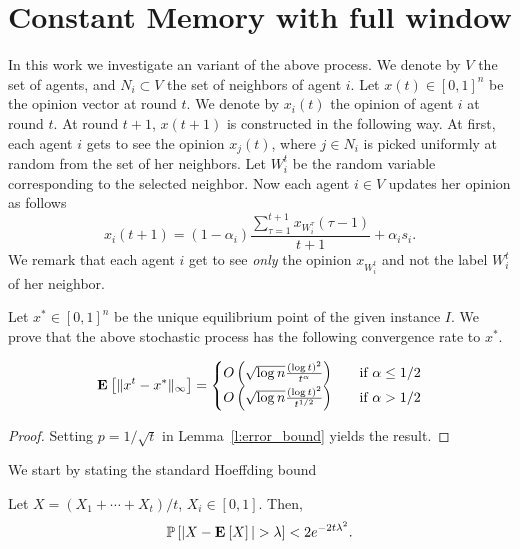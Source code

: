 \section{Constant Memory with full window}

In this work we investigate an variant of the above process.
We denote by $V$ the set of agents, and $N_{i} \subset V$ the set of neighbors
of agent $i$.
Let $x(t) \in [0,1]^n$ be the opinion vector at round $t$.
We denote by $x_i(t)$ the opinion of agent $i$ at round $t$.
At round $t+1$, $x(t+1)$ is constructed in the following way.
At first, each agent $i$ gets to see
the opinion $x_j(t)$, where $j \in N_i$ is picked uniformly at random
from the set of her neighbors.  Let $W_i^t$ be the random variable
corresponding to the selected neighbor. Now each agent $i \in V$
updates her opinion as follows
\[
  x_i(t+1) =
  (1-\alpha_i)\frac{\sum_{\tau=1}^{t+1} x_{W_i^\tau}(\tau-1)}{t+1}
  + \alpha_i s_i.
\]
We remark that each agent $i$ get to see \emph{only} the opinion
$x_{W_i^t}$ and not the label $W_i^t$ of her neighbor.

Let $x^* \in [0,1]^n$ be the unique equilibrium point
of the given instance $I$. We prove that
the above stochastic process has the following convergence
rate to $x^*$.
\begin{theorem}

\[
\Exp{\norm{\infty}{x^t - x^*}} =
    \begin{cases}
      \bigOh{\sqrt{\log n}\frac{(\log t)^{2}}{t^\alpha}}
      &\quad\text{if } \alpha \leq 1/2\\
      \bigOh{\sqrt{\log n}\frac{(\log t)^{2}}{t^{1/2}}}
      &\quad\text{if } \alpha > 1/2\\
    \end{cases}
  \]
\end{theorem}
\begin{proof}
  Setting $p = 1/\sqrt{t}$ in Lemma~\ref{l:error_bound} yields
  the result.
\end{proof}

We start by stating the standard Hoeffding bound

\begin{lemma}\label{l:hoeffding}
  Let $X = (X_1 +\cdots + X_t) /t$, $X_i \in [0,1]$.
  Then,
  \[
    \Prob{|X - \Exp{X} | > \lambda} < 2 e^{-2 t \lambda^2}.
  \]
\end{lemma}

